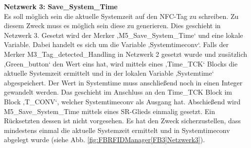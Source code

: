 \textbf{Netzwerk 3: Save\_System\_Time}\\
Es soll möglich sein die aktuelle Systemzeit auf den NFC-Tag zu schreiben. Zu diesem Zweck muss es möglich sein diese zu generieren. Dies geschieht in Netzwerk 3. Gesetzt wird der Merker ‚M5\_Save\_System\_Time‘ und eine lokale Variable. Dabei handelt es sich um die Variable ‚Systemtimeconv‘. Falls der Merker M3\_Tag\_detected\_Handling in Netzwerk 2 gesetzt wurde und zusätzlich ‚Green\_button‘ den Wert eins hat, wird mittels eines ‚Time\_TCK‘ Blocks die aktuelle Systemzeit ermittelt und in der lokalen Variable ‚Systemtime‘ abgespeichert. Der Wert in Systemtime muss anschließend noch in einen Integer gewandelt werden. Das geschieht im Anschluss an den Time\_TCK Block im Block ‚T\_CONV‘, welcher Systemtimeconv als Ausgang hat. Abschießend wird M5\_Save\_System\_Time mittels eines SR-Glieds einmalig gesetzt. Ein Rücksetzten dessen ist nicht vorgesehen. Es hat den Zweck sicherzustellen, dass mindestens einmal die aktuelle Systemzeit ermittelt und in Systemtimeconv abgelegt wurde (siehe Abb. \ref{fig:FBRFIDManager[FB3]Netzwerk3}).

